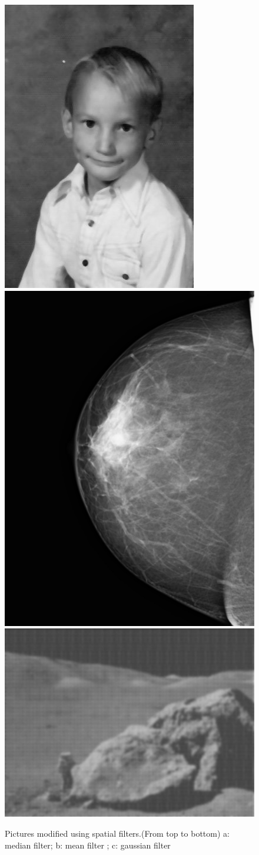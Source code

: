 \documentclass{article}
\begin{document}
\begin{figure}[h]
	\centering
	\includegraphics[width=.4\textwidth]{./immagini_terza_prova/kiddo_1/kiddo_median.jpg}
	\bigbreak
	\includegraphics[width=.4\textwidth]{./immagini_terza_prova/tetta_1/tetta_mean.jpg}
	\bigbreak
	\includegraphics[width=.4\textwidth]{./immagini_terza_prova/moon_1/moonlanding_gauss.jpg}
	\caption{Pictures modified using spatial filters.(From top to bottom) a: median filter; b: mean filter ; c: gaussian filter}\label{two}
\end{figure}
\end{document}

